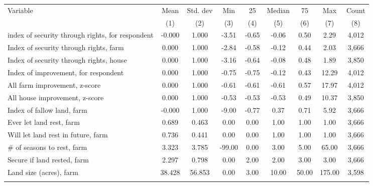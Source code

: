 \begin{tabular}{lcccccccc}
\hline \noalign{\smallskip}Variable & Mean & Std. dev & Min & 25 & Median & 75 & Max & Count\\
 & (1) & (2) & (3) & (4) & (5) & (6) & (7) & (8)\\
\noalign{\smallskip}\hline \noalign{\smallskip}index of security through rights, for respondent & -0.000 & 1.000 & -3.51 & -0.65 & -0.06 & 0.50 & 2.29 & 4,012\\
Index of security through rights, farm & 0.000 & 1.000 & -2.84 & -0.58 & -0.12 & 0.44 & 2.03 & 3,666\\
Index of security through rights, house & 0.000 & 1.000 & -3.16 & -0.64 & -0.08 & 0.48 & 1.89 & 3,850\\
Index of improvement, for respondent & 0.000 & 1.000 & -0.75 & -0.75 & -0.12 & 0.43 & 12.29 & 4,012\\
All farm improvement, z-score & 0.000 & 1.000 & -0.61 & -0.61 & -0.61 & 0.57 & 17.97 & 4,012\\
All house improvement, z-score & 0.000 & 1.000 & -0.53 & -0.53 & -0.53 & 0.49 & 10.37 & 3,850\\
Index of fallow land, farm & -0.000 & 1.000 & -9.00 & -0.77 & 0.37 & 0.71 & 5.92 & 3,666\\
Ever let land rest, farm & 0.689 & 0.463 & 0.00 & 0.00 & 1.00 & 1.00 & 1.00 & 3,666\\
Will let land rest in future, farm & 0.736 & 0.441 & 0.00 & 0.00 & 1.00 & 1.00 & 1.00 & 3,666\\
\# of seasons to rest, farm & 3.323 & 3.785 & -99.00 & 0.00 & 3.00 & 5.00 & 65.00 & 3,666\\
Secure if land rested, farm & 2.297 & 0.798 & 0.00 & 2.00 & 2.00 & 3.00 & 3.00 & 3,666\\
Land size (acres), farm & 38.428 & 56.853 & 0.00 & 3.00 & 10.00 & 50.00 & 175.00 & 3,598\\
\noalign{\smallskip}\hline\end{tabular}
